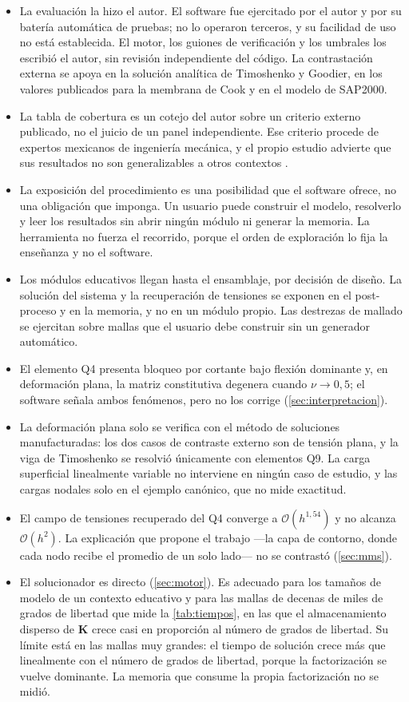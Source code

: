\begin{itemize}
    \item La evaluación la hizo el autor. El software fue ejercitado por el autor y por su batería automática de pruebas; no lo operaron terceros, y su facilidad de uso no está establecida. El motor, los guiones de verificación y los umbrales los escribió el autor, sin revisión independiente del código. La contrastación externa se apoya en la solución analítica de Timoshenko y Goodier, en los valores publicados para la membrana de Cook y en el modelo de SAP2000.
    \item La tabla de cobertura es un cotejo del autor sobre un criterio externo publicado, no el juicio de un panel independiente. Ese criterio procede de expertos mexicanos de ingeniería mecánica, y el propio estudio advierte que sus resultados no son generalizables a otros contextos \autocite[p.~1171]{perezsantiago2023fem}.
    \item La exposición del procedimiento es una posibilidad que el software ofrece, no una obligación que imponga. Un usuario puede construir el modelo, resolverlo y leer los resultados sin abrir ningún módulo ni generar la memoria. La herramienta no fuerza el recorrido, porque el orden de exploración lo fija la enseñanza y no el software.
    \item Los módulos educativos llegan hasta el ensamblaje, por decisión de diseño. La solución del sistema y la recuperación de tensiones se exponen en el post-proceso y en la memoria, y no en un módulo propio. Las destrezas de mallado se ejercitan sobre mallas que el usuario debe construir sin un generador automático.
    \item El elemento Q4 presenta bloqueo por cortante bajo flexión dominante y, en deformación plana, la matriz constitutiva degenera cuando $\nu \to 0{,}5$; el software señala ambos fenómenos, pero no los corrige (\autoref{sec:interpretacion}).
    \item La deformación plana solo se verifica con el método de soluciones manufacturadas: los dos casos de contraste externo son de tensión plana, y la viga de Timoshenko se resolvió únicamente con elementos Q9. La carga superficial linealmente variable no interviene en ningún caso de estudio, y las cargas nodales solo en el ejemplo canónico, que no mide exactitud.
    \item El campo de tensiones recuperado del Q4 converge a $\mathcal{O}(h^{1{,}54})$ y no alcanza $\mathcal{O}(h^{2})$. La explicación que propone el trabajo —la capa de contorno, donde cada nodo recibe el promedio de un solo lado— no se contrastó (\autoref{sec:mms}).
    \item El solucionador es directo (\autoref{sec:motor}). Es adecuado para los tamaños de modelo de un contexto educativo y para las mallas de decenas de miles de grados de libertad que mide la \autoref{tab:tiempos}, en las que el almacenamiento disperso de $\bm{K}$ crece casi en proporción al número de grados de libertad. Su límite está en las mallas muy grandes: el tiempo de solución crece más que linealmente con el número de grados de libertad, porque la factorización se vuelve dominante. La memoria que consume la propia factorización no se midió.
\end{itemize}

